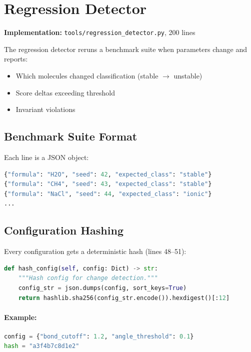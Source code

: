 \documentclass[11pt]{article}
\begin{document}
\section{Regression Detector}

\textbf{Implementation:} \texttt{tools/regression\_detector.py}, 200 lines

The regression detector reruns a benchmark suite when parameters change and reports:
\begin{itemize}
\item Which molecules changed classification (stable $\to$ unstable)
\item Score deltas exceeding threshold
\item Invariant violations
\end{itemize}

\subsection{Benchmark Suite Format}

Each line is a JSON object:

\begin{lstlisting}[language=Python]
{"formula": "H2O", "seed": 42, "expected_class": "stable"}
{"formula": "CH4", "seed": 43, "expected_class": "stable"}
{"formula": "NaCl", "seed": 44, "expected_class": "ionic"}
...
\end{lstlisting}

\subsection{Configuration Hashing}

Every configuration gets a deterministic hash (lines 48--51):

\begin{lstlisting}[language=Python]
def hash_config(self, config: Dict) -> str:
    """Hash config for change detection."""
    config_str = json.dumps(config, sort_keys=True)
    return hashlib.sha256(config_str.encode()).hexdigest()[:12]
\end{lstlisting}

\paragraph{Example:}
\begin{lstlisting}[language=Python]
config = {"bond_cutoff": 1.2, "angle_threshold": 0.1}
hash = "a3f4b7c8d1e2"
\end{lstlisting}
\end{document}
